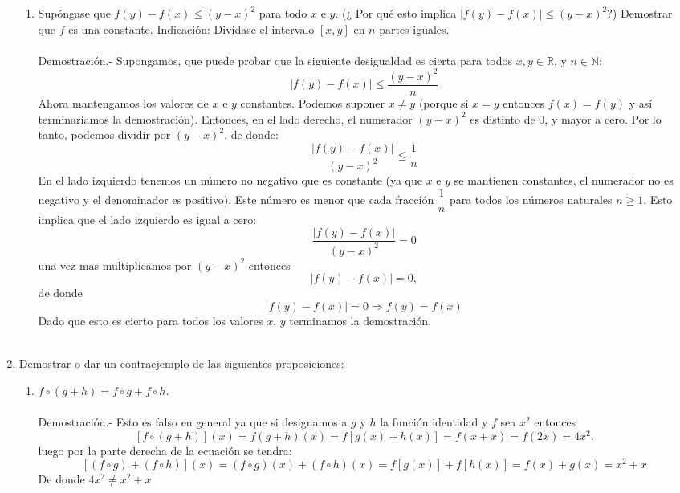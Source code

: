 \begin{enumerate}
\begin{enumerate}[\bfseries (a)]
	    \item Supóngase que $f(y) - f(x) \leq (y-x)^2$ para todo $x$ e $y.$ (¿ Por qué esto implica $|f(y) - f(x)| \leq (y-x)^2$?) Demostrar que $f$ es una constante. Indicación: Divídase el intervalo $[x,y]$ en $n$ partes iguales.\\\\
		Demostración.-\; Supongamos, que puede probar que la siguiente desigualdad es cierta para todos $x , y \in \mathbb{R}$, y $n \in \mathbb{N}$: $$|f(y) - f(x)| \leq \dfrac{(y-x)^2}{n}$$ Ahora mantengamos los valores de $x$ e $y$ constantes. Podemos suponer $x\neq y$ (porque si $x=y$ entonces $f(x)=f(y)$ y así terminaríamos la demostración). Entonces, en el lado derecho, el numerador $(y-x)^2$ es distinto de $0$, y mayor a cero. Por lo tanto, podemos dividir por $(y-x)^2$, de donde: $$\dfrac{|f(y) - f(x)|}{(y-x)^2} \leq \dfrac{1}{n}$$ En el lado izquierdo tenemos un número no negativo que es constante (ya que $x$ e $y$ se mantienen constantes, el numerador no es negativo y el denominador es positivo). Este número es menor que cada fracción $\dfrac{1}{n}$ para todos los números naturales $n\geq 1$. Esto implica que el lado izquierdo es igual a cero:
		$$\dfrac{|f(y) - f(x)|}{(y-x)^2} = 0$$ una vez mas multiplicamos por $(y-x)^2$ entonces $$|f(y)-f(x)|=0,$$ de donde $$|f(y)-f(x)|=0 \Longrightarrow f(y)=f(x)$$
		Dado que esto es cierto para todos los valores $x$, $y$  terminamos la demostración.\\\\

	\end{enumerate}

	\item  Demostrar o dar un contraejemplo de las siguientes proposiciones:

	    \begin{enumerate}[\bfseries (a)]

		\item $f \circ (g+h) = f \circ g + f \circ h.$\\\\
		    Demostración.-\; Esto es falso en general ya que si designamos a $g$ y $h$ la función identidad y  $f$ sea $x^2$ entonces $$\left[ f \circ (g+h) \right](x) = f\left(  g + h\right)(x)=f \left[ g(x) +  h(x) \right] = f(x+x)= f(2x) = 4x^2.$$ 
		    luego por la parte derecha de la ecuación se tendra:
		    $$\left[ \left( f\circ g \right) + \left( f \circ h \right)\right]\left(x \right) = \left(f \circ g \right) \left(x\right) + \left( f \circ h \right)\left(x\right) = f\left[g\left(x\right)\right] + f\left[h \left(x\right)\right] = f\left(x\right) + g\left(x\right) = x^2 + x$$
		    De donde $4x^2 \neq x^2 + x$\\\\


\end{enumerate}
\end{enumerate}
